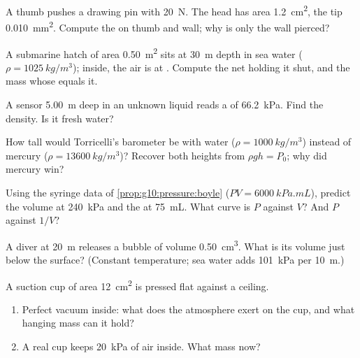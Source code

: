 \begin{exercise}[$\star\star$]\label{exo:g10:pressure:6}
A thumb pushes a drawing pin with \qty{20}{N}. The head has area
\qty{1.2}{cm^2}, the tip \qty{0.010}{mm^2}. Compute the  on
thumb and wall; why is only the wall pierced?
\end{exercise}

\begin{exercise}[$\star\star$]\label{exo:g10:pressure:7}
A submarine hatch of area \qty{0.50}{m^2} sits at \qty{30}{m} depth in
sea water ($\rho = \qty{1025}{kg/m^3}$); inside, the air is at
. Compute the net  holding it shut, and the
mass whose  equals it.
\end{exercise}

\begin{exercise}[$\star\star$]\label{exo:g10:pressure:8}
A sensor \qty{5.00}{m} deep in an unknown liquid reads a  of \qty{66.2}{kPa}. Find the density. Is it fresh water?
\end{exercise}

\begin{exercise}[$\star\star$]\label{exo:g10:pressure:9}
How tall would Torricelli's barometer be with water
($\rho = \qty{1000}{kg/m^3}$) instead of mercury
($\rho = \qty{13600}{kg/m^3}$)? Recover both heights from
$\rho g h = P_0$; why did mercury win?
\end{exercise}

\begin{exercise}[$\star\star$]\label{exo:g10:pressure:10}
Using the syringe data of \cref{prop:g10:pressure:boyle}
($PV = \qty{6000}{kPa.mL}$), predict the volume at \qty{240}{kPa} and
the  at \qty{75}{mL}. What curve is $P$ against $V$? And $P$
against $1/V$?
\end{exercise}

\begin{exercise}[$\star\star$]\label{exo:g10:pressure:11}
A diver at \qty{20}{m} releases a bubble of volume \qty{0.50}{cm^3}.
What is its volume just below the surface? (Constant temperature; sea
water adds \qty{101}{kPa} per \qty{10}{m}.)
\end{exercise}

\begin{exercise}[$\star\star\star$]\label{exo:g10:pressure:12}
A suction cup of area \qty{12}{cm^2} is pressed flat against a ceiling.
\begin{enumerate}
  \item Perfect vacuum inside: what  does the atmosphere exert on
        the cup, and what hanging mass can it hold?
  \item A real cup keeps \qty{20}{kPa} of air inside. What mass now?
\end{enumerate}
\end{exercise}

